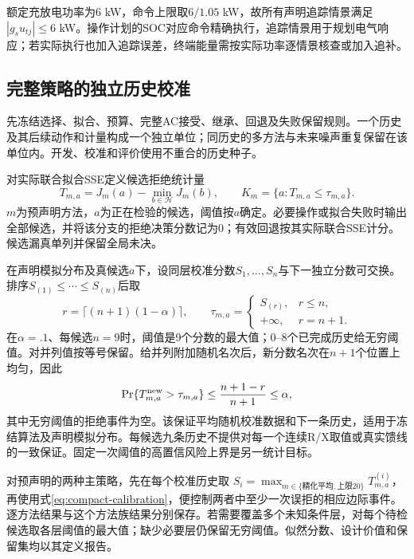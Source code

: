 \documentclass[UTF8,fontset=fandol,11pt,a4paper]{ctexart}
\newcommand{\HH}{\mathcal H}
\begin{document}
额定充放电功率为6 kW，命令上限取$6/1.05$ kW，故所有声明追踪情景满足$|g_su_{tj}|\le6$ kW。操作计划的SOC对应命令精确执行，追踪情景用于规划电气响应；若实际执行也加入追踪误差，终端能量需按实际功率逐情景核查或加入追补。

\subsection{完整策略的独立历史校准}
先冻结选择、拟合、预算、完整AC接受、继承、回退及失败保留规则。一个历史及其后续动作和计量构成一个独立单位；同历史的多方法与未来噪声重复保留在该单位内。开发、校准和评价使用不重合的历史种子。

对实际联合拟合SSE定义候选拒绝统计量
\begin{equation}
 T_{m,a}=J_m(a)-\min_{b\in\HH}J_m(b),\qquad
 K_m=\{a:T_{m,a}\le\tau_{m,a}\}.
 \label{eq:compact-rejection-score}
\end{equation}
$m$为预声明方法，$a$为正在检验的候选，阈值按$a$确定。必要操作或拟合失败时输出全部候选，并将该分支的拒绝决策分数记为0；有效回退按其实际联合SSE计分。候选漏真单列并保留全局未决。

在声明模拟分布及真候选$a$下，设同层校准分数$S_1,\ldots,S_n$与下一独立分数可交换。排序$S_{(1)}\le\cdots\le S_{(n)}$后取
\begin{equation}
 r=\lceil(n+1)(1-\alpha)\rceil,\qquad
 \tau_{m,a}=\begin{cases}S_{(r)},&r\le n,\\+\infty,&r=n+1.\end{cases}
 \label{eq:compact-calibration}
\end{equation}
在$\alpha=.1$、每候选$n=9$时，阈值是9个分数的最大值；0--8个已完成历史给无穷阈值。对并列值按等号保留。给并列附加随机名次后，新分数名次在$n+1$个位置上均匀，因此
\begin{equation}
 \Pr\{T_{m,a}^{\rm new}>\tau_{m,a}\}
 \le\frac{n+1-r}{n+1}\le\alpha,
 \label{eq:compact-marginal-control}
\end{equation}
其中无穷阈值的拒绝事件为空。该保证平均随机校准数据和下一条历史，适用于冻结算法及声明模拟分布。每候选九条历史不提供对每一个连续R/X取值或真实馈线的一致保证。固定一次阈值的高置信风险上界是另一统计目标。

对预声明的两种主策略，先在每个校准历史取
$S_i=\max_{m\in\{\text{精化平均},\text{上限20}\}}T_{m,a}^{(i)}$，再使用式\eqref{eq:compact-calibration}，便控制两者中至少一次误拒的相应边际事件。逐方法结果与这个方法族结果分别保存。若需要覆盖多个未知条件层，对每个待检候选取各层阈值的最大值；缺少必要层仍保留无穷阈值。似然分数、设计价值和保留集均以其定义报告。
\end{document}
